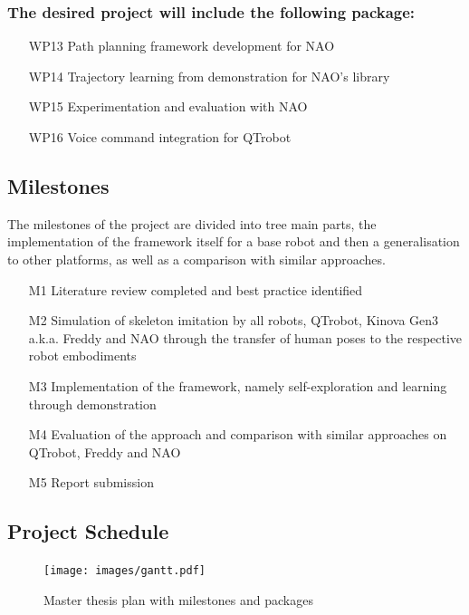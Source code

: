 \documentclass[thesis]{mas_proposal}
\begin{document}
	\subsubsection{The desired project will include the following package:}
	
		\begin{enumerate}
			\item[WP13] Path planning framework development for NAO
			\item[WP14] Trajectory learning from demonstration for NAO's library
			\item[WP15] Experimentation and evaluation with NAO
			\item[WP16] Voice command integration for QTrobot 
		\end{enumerate}
	
	\subsection{Milestones}
		
		The milestones of the project are divided into tree main parts, the implementation of the framework itself for a base robot and then a generalisation to other platforms, as well as a comparison with similar approaches.
		
		\begin{enumerate}
		    \item[M1] Literature review completed and best practice identified
		  	\item[M2] Simulation of skeleton imitation by all robots, QTrobot, Kinova Gen3 a.k.a. Freddy and NAO through the transfer of human poses to the respective robot embodiments
		    \item[M3] Implementation of the framework, namely self-exploration and learning through demonstration
		    \item[M4] Evaluation of the approach and comparison with similar approaches on QTrobot, Freddy and NAO
		    \item[M5] Report submission
		\end{enumerate}
	
	\subsection{Project Schedule}

	\begin{figure}[h!]
	    \texttt{[image: images/gantt.pdf]}
	    \caption{Master thesis plan with milestones and packages}
	    \label{fig:gantt}
	\end{figure}
\end{document}
